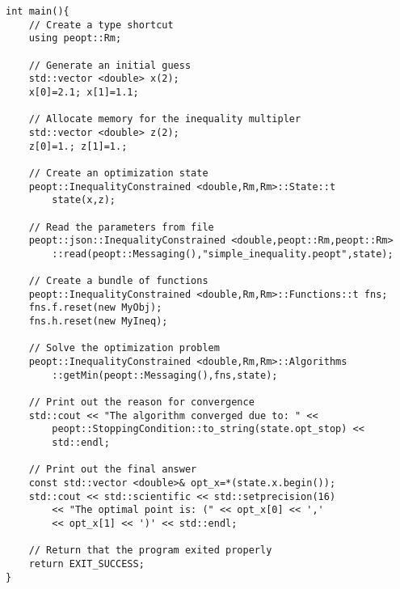 \begin{lstlisting}
int main(){
    // Create a type shortcut
    using peopt::Rm;
    
    // Generate an initial guess 
    std::vector <double> x(2);
    x[0]=2.1; x[1]=1.1;
    
    // Allocate memory for the inequality multipler 
    std::vector <double> z(2);
    z[0]=1.; z[1]=1.;
    
    // Create an optimization state
    peopt::InequalityConstrained <double,Rm,Rm>::State::t
        state(x,z);
    
    // Read the parameters from file
    peopt::json::InequalityConstrained <double,peopt::Rm,peopt::Rm>
        ::read(peopt::Messaging(),"simple_inequality.peopt",state);
    
    // Create a bundle of functions
    peopt::InequalityConstrained <double,Rm,Rm>::Functions::t fns;
    fns.f.reset(new MyObj);
    fns.h.reset(new MyIneq);
    
    // Solve the optimization problem
    peopt::InequalityConstrained <double,Rm,Rm>::Algorithms
        ::getMin(peopt::Messaging(),fns,state);
    
    // Print out the reason for convergence
    std::cout << "The algorithm converged due to: " <<
        peopt::StoppingCondition::to_string(state.opt_stop) <<
        std::endl;
    
    // Print out the final answer
    const std::vector <double>& opt_x=*(state.x.begin());
    std::cout << std::scientific << std::setprecision(16)
        << "The optimal point is: (" << opt_x[0] << ','
        << opt_x[1] << ')' << std::endl;

    // Return that the program exited properly
    return EXIT_SUCCESS;
}
\end{lstlisting}
